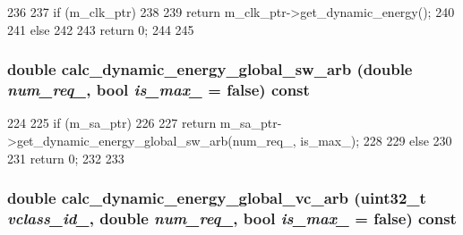 \begin{DoxyCode}
236 {
237     if (m_clk_ptr)
238     {
239         return m_clk_ptr->get_dynamic_energy();
240     }
241     else
242     {
243         return 0;
244     }
245 }
\end{DoxyCode}
\hypertarget{classOrionRouter_a073f1dd3e634d86be25367d729494507}{
\subsubsection[{calc\_\-dynamic\_\-energy\_\-global\_\-sw\_\-arb}]{\setlength{\rightskip}{0pt plus 5cm}double calc\_\-dynamic\_\-energy\_\-global\_\-sw\_\-arb (double {\em num\_\-req\_\-}, \/  bool {\em is\_\-max\_\-} = {\ttfamily false}) const}}
\label{classOrionRouter_a073f1dd3e634d86be25367d729494507}



\begin{DoxyCode}
224 {
225     if (m_sa_ptr)
226     {
227         return m_sa_ptr->get_dynamic_energy_global_sw_arb(num_req_, is_max_);
228     }
229     else
230     {
231         return 0;
232     }
233 }
\end{DoxyCode}
\hypertarget{classOrionRouter_aa6e38b256dbf2a34dc0472dfb4a71f0c}{
\subsubsection[{calc\_\-dynamic\_\-energy\_\-global\_\-vc\_\-arb}]{\setlength{\rightskip}{0pt plus 5cm}double calc\_\-dynamic\_\-energy\_\-global\_\-vc\_\-arb ({\bf uint32\_\-t} {\em vclass\_\-id\_\-}, \/  double {\em num\_\-req\_\-}, \/  bool {\em is\_\-max\_\-} = {\ttfamily false}) const}}
\label{classOrionRouter_aa6e38b256dbf2a34dc0472dfb4a71f0c}



